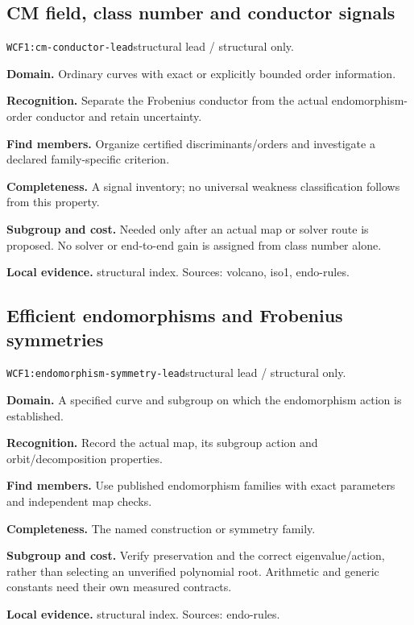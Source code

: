 \documentclass[10pt]{article}
\begin{document}
\subsection{CM field, class number and conductor signals}
\texttt{WCF1:cm-conductor-lead}\quad structural lead / structural only.\par
\textbf{Domain.} Ordinary curves with exact or explicitly bounded order information.\par
\textbf{Recognition.} Separate the Frobenius conductor from the actual endomorphism-order conductor and retain uncertainty.\par
\textbf{Find members.} Organize certified discriminants/orders and investigate a declared family-specific criterion.\par
\textbf{Completeness.} A signal inventory; no universal weakness classification follows from this property.\par
\textbf{Subgroup and cost.} Needed only after an actual map or solver route is proposed. No solver or end-to-end gain is assigned from class number alone.\par
\textbf{Local evidence.} structural index. Sources: volcano, iso1, endo-rules.
\subsection{Efficient endomorphisms and Frobenius symmetries}
\texttt{WCF1:endomorphism-symmetry-lead}\quad structural lead / structural only.\par
\textbf{Domain.} A specified curve and subgroup on which the endomorphism action is established.\par
\textbf{Recognition.} Record the actual map, its subgroup action and orbit/decomposition properties.\par
\textbf{Find members.} Use published endomorphism families with exact parameters and independent map checks.\par
\textbf{Completeness.} The named construction or symmetry family.\par
\textbf{Subgroup and cost.} Verify preservation and the correct eigenvalue/action, rather than selecting an unverified polynomial root. Arithmetic and generic constants need their own measured contracts.\par
\textbf{Local evidence.} structural index. Sources: endo-rules.
\end{document}
